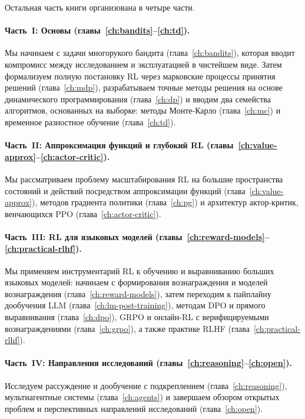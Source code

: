 Остальная часть книги организована в четыре части.

\paragraph{Часть~I: Основы (главы~\ref{ch:bandits}--\ref{ch:td}).}
Мы начинаем с задачи многорукого бандита (глава~\ref{ch:bandits}), которая вводит компромисс между исследованием и эксплуатацией в чистейшем виде.  Затем формализуем полную постановку RL через марковские процессы принятия решений (глава~\ref{ch:mdp}), разрабатываем точные методы решения на основе динамического программирования (глава~\ref{ch:dp}) и вводим два семейства алгоритмов, основанных на выборке: методы Монте-Карло (глава~\ref{ch:mc}) и временное разностное обучение (глава~\ref{ch:td}).

\paragraph{Часть~II: Аппроксимация функций и глубокий RL (главы~\ref{ch:value-approx}--\ref{ch:actor-critic}).}
Мы рассматриваем проблему масштабирования RL на большие пространства состояний и действий посредством аппроксимации функций (глава~\ref{ch:value-approx}), методов градиента политики (глава~\ref{ch:pg}) и архитектур актор-критик, венчающихся PPO (глава~\ref{ch:actor-critic}).

\paragraph{Часть~III: RL для языковых моделей (главы~\ref{ch:reward-models}--\ref{ch:practical-rlhf}).}
Мы применяем инструментарий RL к обучению и выравниванию больших языковых моделей: начинаем с формирования вознаграждения и моделей вознаграждения (глава~\ref{ch:reward-models}), затем переходим к пайплайну дообучения LLM (глава~\ref{ch:lm-post-training}), методам DPO и прямого выравнивания (глава~\ref{ch:dpo}), GRPO и онлайн-RL с верифицируемыми вознаграждениями (глава~\ref{ch:grpo}), а также практике RLHF (глава~\ref{ch:practical-rlhf}).

\paragraph{Часть~IV: Направления исследований (главы~\ref{ch:reasoning}--\ref{ch:open}).}
Исследуем рассуждение и дообучение с подкреплением (глава~\ref{ch:reasoning}), мультиагентные системы (глава~\ref{ch:agents}) и завершаем обзором открытых проблем и перспективных направлений исследований (глава~\ref{ch:open}).


